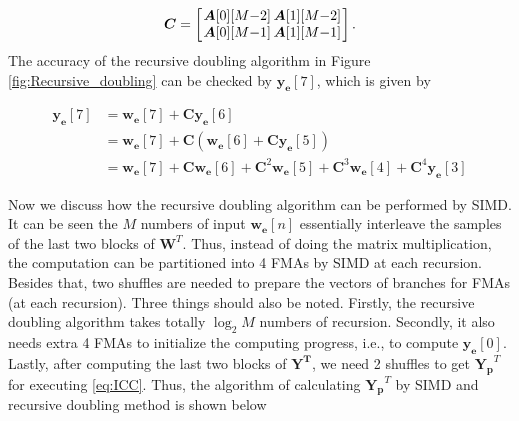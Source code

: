 \begin{equation*}
    \bm{C} = \left[\arraycolsep=1.0pt\def\arraystretch{1.0}
        \begin{array}{cc}
        \bm{A}[0][M{-}2] & \bm{A}[1][M{-}2] \\ 
        \bm{A}[0][M{-}1] & \bm{A}[1][M{-}1] \\ 
        \end{array}\right].
\end{equation*}
The accuracy of the recursive doubling algorithm in Figure \ref{fig:Recursive_doubling} can be checked by
$\bm{y_e}[7]$, which is given by

\begin{equation}
    \begin{aligned}
        \bm{y_e}[7] &= \bm{w_e}[7] + \bm{C}\bm{y_e}[6] \\
        &= \bm{w_e}[7] + \bm{C}(\bm{w_e}[6] + \bm{C}\bm{y_e}[5]) \\
        &= \bm{w_e}[7] + \bm{C}\bm{w_e}[6] + \bm{C}^2\bm{w_e}[5] + \bm{C}^3\bm{w_e}[4] + \bm{C}^4\bm{y_e}[3]
    \end{aligned}
\end{equation}

Now we discuss how the recursive doubling algorithm can be performed by SIMD.
It can be seen the $M$ numbers of input $\bm{w_e}[n]$
essentially interleave the samples of the last two blocks of $\bm{W}^T$.
Thus, instead of doing the matrix multiplication, the computation can be partitioned into 4 FMAs by SIMD at each
recursion. Besides that, two shuffles are needed to prepare the vectors of branches for FMAs (at each recursion). 
Three things should also be noted. Firstly, the recursive doubling algorithm takes totally $\log_2M$ numbers of recursion.
Secondly, it also needs extra 4 FMAs to initialize the computing progress, i.e., to compute $\bm{y_e}[0]$.
Lastly, after computing the last two blocks of $\bm{Y^T}$, 
we need 2 shuffles to get $\bm{Y_p}^T$ for executing \eqref{eq:ICC}. 
Thus, 
the algorithm of calculating $\bm{Y_p}^T$ by SIMD and recursive doubling method is shown below 

